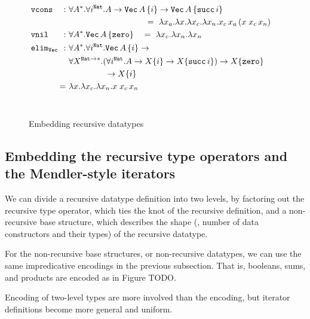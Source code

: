 \begin{figure}
\begin{align*}
 &\!\!\!\!\!\!\texttt{vcons} &\!\!\!\!\!\!\!\!:~& \forall A^{*}.\forall i^\mathtt{Nat}.A-> \mathtt{Vec}\,A\,\{i\}-> \mathtt{Vec}\,A\,\{\mathtt{succ}\,i\} \\
&&&\,\qquad~\qquad~\qquad~\quad~ ~~=~ \l x_a.\l x.\l x_c.\l x_n. x_c\,x_a\,(x\;x_c\,x_n) \\
&\!\!\!\!\!\!\mathtt{vnil} &\!\!\!\!\!\!\!\!:~& \forall A^{*}.\texttt{Vec}\,A\,\{\mathtt{zero}\} 
~~~=~ \l x_c.\l x_n.\l x_n \\
&\!\!\!\!\!\!\mathtt{elim_{Vec}} &\!\!\!\!\!\!\!\!:~& \forall A^{*}.\forall i^\mathtt{Nat}.\texttt{Vec}\,A\,\{i\} -> \\
&&& \forall X^{\mathtt{Nat}-> *}.(\forall i^\mathtt{Nat}.A -> X\{i\} -> X\{\mathtt{succ}\,i\}) -> X\{\mathtt{zero}\} \\
&&& \qquad~\qquad -> X\{i\} \\
& &\!\!\!\!\!=~& \l x.\l x_c. \l x_n.x\;x_c\,x_n
\end{align*} ~\vspace*{-10pt}
\caption{Embedding recursive datatypes}
\label{fig:churchrec}
\end{figure}




\subsection{
   Embedding the recursive type operators and the Mendler-style iterators}
\label{ssec:embedTwoLevel}
We can divide a recursive datatype definition into two levels,
by factoring out the recursive type operator, which ties the knot of
the recursive definition, and a non-recursive base structure,
which describes the shape (\ie, number of data constructors and their types) of
the recursive datatype.

For the non-recursive base structures, or non-recursive datatypes,
we can use the same impredicative encodings in the previous subsection.
That is, booleans, sums, and products are encoded as in Figure TODO.

Encoding of two-level types are more involved than the encoding, but
iterator definitions become more general and uniform.

